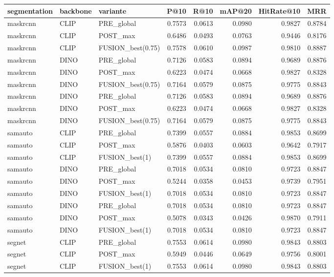 \begin{tabular}{lllrrrrr}
\toprule
segmentation & backbone & variante & P@10 & R@10 & mAP@20 & HitRate@10 & MRR \\
\midrule
maskrcnn & CLIP & PRE_global & 0.7573 & 0.0613 & 0.0980 & 0.9827 & 0.8784 \\
maskrcnn & CLIP & POST_max & 0.6486 & 0.0493 & 0.0763 & 0.9446 & 0.8176 \\
maskrcnn & CLIP & FUSION_best(0.75) & 0.7578 & 0.0610 & 0.0987 & 0.9810 & 0.8887 \\
maskrcnn & DINO & PRE_global & 0.7126 & 0.0583 & 0.0894 & 0.9689 & 0.8876 \\
maskrcnn & DINO & POST_max & 0.6223 & 0.0474 & 0.0668 & 0.9827 & 0.8328 \\
maskrcnn & DINO & FUSION_best(0.75) & 0.7164 & 0.0579 & 0.0875 & 0.9775 & 0.8843 \\
maskrcnn & DINO & PRE_global & 0.7126 & 0.0583 & 0.0894 & 0.9689 & 0.8876 \\
maskrcnn & DINO & POST_max & 0.6223 & 0.0474 & 0.0668 & 0.9827 & 0.8328 \\
maskrcnn & DINO & FUSION_best(0.75) & 0.7164 & 0.0579 & 0.0875 & 0.9775 & 0.8843 \\
samauto & CLIP & PRE_global & 0.7399 & 0.0557 & 0.0884 & 0.9853 & 0.8699 \\
samauto & CLIP & POST_max & 0.5876 & 0.0403 & 0.0603 & 0.9642 & 0.7917 \\
samauto & CLIP & FUSION_best(1) & 0.7399 & 0.0557 & 0.0884 & 0.9853 & 0.8699 \\
samauto & DINO & PRE_global & 0.7018 & 0.0534 & 0.0810 & 0.9723 & 0.8847 \\
samauto & DINO & POST_max & 0.5244 & 0.0358 & 0.0453 & 0.9739 & 0.7951 \\
samauto & DINO & FUSION_best(1) & 0.7018 & 0.0534 & 0.0810 & 0.9723 & 0.8847 \\
samauto & DINO & PRE_global & 0.7018 & 0.0534 & 0.0810 & 0.9723 & 0.8847 \\
samauto & DINO & POST_max & 0.5078 & 0.0343 & 0.0426 & 0.9870 & 0.7911 \\
samauto & DINO & FUSION_best(1) & 0.7018 & 0.0534 & 0.0810 & 0.9723 & 0.8847 \\
segnet & CLIP & PRE_global & 0.7553 & 0.0614 & 0.0980 & 0.9843 & 0.8803 \\
segnet & CLIP & POST_max & 0.5949 & 0.0446 & 0.0649 & 0.9756 & 0.8001 \\
segnet & CLIP & FUSION_best(1) & 0.7553 & 0.0614 & 0.0980 & 0.9843 & 0.8803 \\

\end{tabular}
